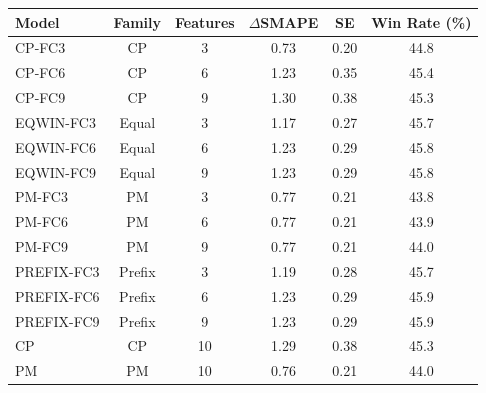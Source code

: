 \begin{tabular}{@{}lccccc@{}}
\toprule
Model & Family & Features & $\Delta$SMAPE & SE & Win Rate (\%) \\
\midrule
CP-FC3 & CP & 3 & 0.73 & 0.20 & 44.8 \\
CP-FC6 & CP & 6 & 1.23 & 0.35 & 45.4 \\
CP-FC9 & CP & 9 & 1.30 & 0.38 & 45.3 \\
EQWIN-FC3 & Equal & 3 & 1.17 & 0.27 & 45.7 \\
EQWIN-FC6 & Equal & 6 & 1.23 & 0.29 & 45.8 \\
EQWIN-FC9 & Equal & 9 & 1.23 & 0.29 & 45.8 \\
PM-FC3 & PM & 3 & 0.77 & 0.21 & 43.8 \\
PM-FC6 & PM & 6 & 0.77 & 0.21 & 43.9 \\
PM-FC9 & PM & 9 & 0.77 & 0.21 & 44.0 \\
PREFIX-FC3 & Prefix & 3 & 1.19 & 0.28 & 45.7 \\
PREFIX-FC6 & Prefix & 6 & 1.23 & 0.29 & 45.9 \\
PREFIX-FC9 & Prefix & 9 & 1.23 & 0.29 & 45.9 \\
CP & CP & 10 & 1.29 & 0.38 & 45.3 \\
PM & PM & 10 & 0.76 & 0.21 & 44.0 \\
\bottomrule
\end{tabular}
